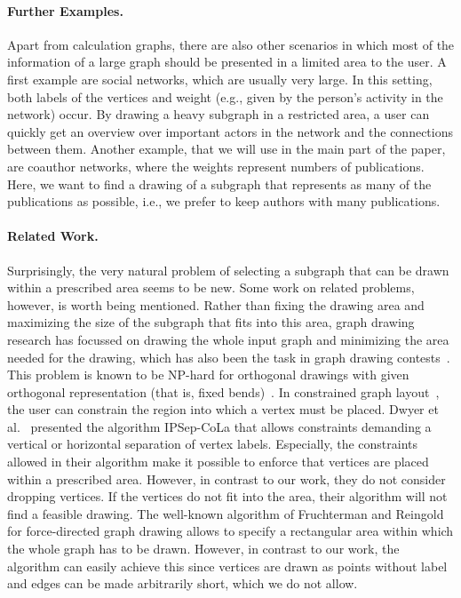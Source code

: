 \documentclass[]{llncs}
\begin{document}
\paragraph{Further Examples.} Apart from calculation graphs, there are
also other scenarios in which most of the information of a large graph
should be presented in a limited area to the user. A first example are
social networks, which are usually very large. In this setting, both
labels of the vertices and weight (e.g., given by the person's
activity in the network) occur. By drawing a heavy subgraph in a
restricted area, a user can quickly get an overview over important
actors in the network and the connections between them. Another
example, that we will use in the main part of the paper, are coauthor
networks, where the weights represent numbers of publications. Here,
we want to find a drawing of a subgraph that represents as many of the
publications as possible, i.e., we prefer to keep authors with many
publications.

\paragraph{Related Work.} 
Surprisingly, the very natural problem of selecting a subgraph that
can be drawn within a prescribed area seems to be new.  Some work on
related problems, however, is worth being mentioned.  Rather than
fixing the drawing area and maximizing the size of the subgraph that
fits into this area, graph drawing research has focussed on drawing
the whole input graph and minimizing the area needed for the
drawing, which has also been the task in graph drawing
contests~\cite{gdcontest2012}. This
problem is known to be NP-hard for orthogonal drawings with given
orthogonal representation (that is, fixed
bends)~\cite{Patrignani200147}.  In constrained graph
layout~\cite{He1998,Dwyer2009}, the user can constrain the region into
which a vertex must be placed.  
Dwyer et al.~\cite{ipsepcola} presented the algorithm IPSep-CoLa that
allows constraints demanding a vertical or horizontal separation of
vertex labels. Especially, the constraints allowed in their algorithm
make it possible
to enforce that vertices are placed within a prescribed area. However,
in contrast to our work, they do not consider dropping vertices. If
the vertices do not fit into the area, their algorithm will not find a
feasible drawing.
The well-known algorithm of Fruchterman and
Reingold~\cite{Fruchterman1991} for force-directed graph drawing
allows to specify a rectangular area within which the whole graph has
to be drawn. However, in contrast to our work, the algorithm can
easily achieve this since vertices are drawn as points without label
and edges can be made arbitrarily short, which we do not allow.
\end{document}
